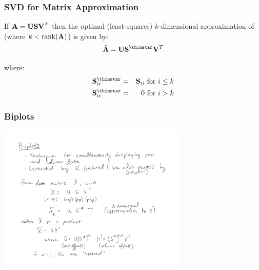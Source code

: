 \documentclass{beamer}
\DeclareMathOperator{\rank}{rank}
\begin{document}
\begin{frame}
  \frametitle{SVD for Matrix Approximation}

If $ \mathbf{A} = \mathbf{U} \mathbf{S} \mathbf{V}^T $
then the optimal (least-squares) $k$-dimensional approximation of  (where $ k < \rank(\Mtx{A})$) is given by:
$$ \tilde{\Mtx{A}} = \Mtx{U}\Mtx{S}^{\thinstar} \Mtx{V}^T$$ 

where:
\begin{eqnarray*}
\Mtx{S}_{ii}^{\thinstar} &=& \Mtx{S}_{ii} \text{ for } i \leq k\\
\Mtx{S}_{ii}^{\thinstar} &=& 0 \text{ for } i > k\\
\end{eqnarray*}

\end{frame}


\begin{frame}
  \frametitle{Biplots}


\begin{center}
\includegraphics[height=2.75in]{about-biplots}
\end{center}

\end{frame}

\end{document}
